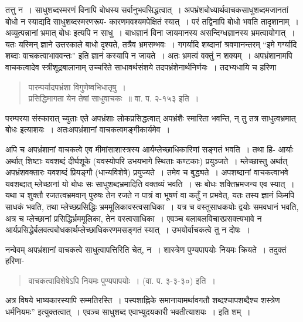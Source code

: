 {तत्तु न~। साधुशब्दस्मरणं विनापि बोधस्य सर्वानुभवसिद्धत्वात्~। अपभ्रंशबोध्यार्थवाचकसाधुशब्दमजानतां बोधो न स्याद्यदि साधुशब्दस्मरणरूप- कारणमवश्यमपेक्षितं स्यात्~। परं तद्विनापि बोधो भवति तादृशानाम्~। अव्युत्पन्नानां भ्रमात् बोधः इत्यपि न साधु~। बाधज्ञानं विना जायमानस्य असन्दिग्धज्ञानस्य भ्रमत्वायोगात्~। यतः यस्मिन् ज्ञाने उत्तरकाले बाधो दृश्यते, तत्रैव भ्रमसम्भवः~। गगर्यादि शब्दानां श्रवणानन्तरम् “इमे गर्ग्यादि शब्दाः वाचकत्वाभाववन्तः” इति ज्ञानं कस्यापि न जायते~। अतः भ्रमत्वं वक्तुं न शक्यम्~। अपभ्रंशानामपि वाचकत्वादेव स्त्रीशूद्रबालानाम् उच्चरिते साधावर्थसंशये तदपभ्रंशेनार्थनिर्णयः~। तदभ्यधायि च हरिणा 
\begin{verse}
पारम्पर्यादपभ्रंशा विगुणेष्वभिधातृषु~। \\
प्रसिद्धिमागता येन तेषां साधुवाचकः~॥ वा. प. २-१५३ इति~। 
\end{verse}
परम्परया संस्कारात् च्युताः एते अपभ्रंशाः लोकप्रसिद्धत्वात्  अपभ्रंशैः स्मारिता भवन्ति, न् तु तत्र साधुत्वभ्रमात् बोधः इत्याशयः~। अतःअपभ्रंशानां वाचकत्वमङ्गीकार्यमेव~। 

अपि च अपभ्रंशानां वाचकत्वे एव मीमांसाशास्त्रस्य आर्यम्लेच्छाधिकारिणां सङ्गतं भवति~। तथा हि- आर्याः अर्थात् शिष्टाः यवशब्दं दीर्घशूके (यवस्योपरि उभयभागे स्थिताः कण्टकाः) प्रयुञ्जते~। म्लेच्छास्तु अर्थात् अपभ्रंशवक्तारः यवशब्दं प्रियङ्गौ (धान्यविशेषे) प्रयुज्यते~। तमेव च बुद्ध्यते~। अपशब्दानां वाचकत्वाभवे यवशब्दात् म्लेच्छानां यो बोधः सः साधुशब्दभ्रमादिति वक्तव्यं भवति~। सः बोधः शक्तिभ्रमजन्य एव स्यात्~। यथा च शुक्तौ रजतत्वभ्रमवान् पुरुषः तेन रजते न पात्रं वा भूषणं वा कर्तुं न प्रभवेत्, यतः तस्य ज्ञानं किमपि साधकं भवति, तथा म्लेच्छप्रसिद्धिः भ्रममूलिकावस्त्वसाधिका~। यत्र च वस्तुसाधकयोः द्वयोः समवधानं भवति, अत्र च म्लेच्छानां प्रसिद्धिर्भ्रममूलिका, तेन वस्त्वसाधिका~। एवञ्च बलाबलविचारप्रसक्त्यभावे न आर्यप्रसिद्धेर्बलवत्वबोधकार्थम्लेच्छाधिकरणमसङ्गतं स्यात्~। उभयोर्वाचकत्वे तु न दोषः~। 

नन्वेवम् अपभ्रंशानां वाचकत्वे साधुत्वापत्तिरिति चेत्, न~। शास्त्रेण पुण्यपापयोः नियमः क्रियते~। तदुक्तं हरिणा-
\begin{verse}
वाचकत्वाविशेषेऽपि नियमः पुण्यपापयोः~। (वा. प. ३-३-३०) इति~। 
\end{verse}
अत्र विषये भाष्यकारस्यापि सम्मतिरस्ति~। पस्पशाह्निके समानायामर्थावगतौ शब्द\-श्चापशब्दैश्च शस्त्रेण धर्मनियमः” इत्युक्तत्वात्~। एवञ्च साधुशब्द एवाभ्युदयकारी भवतीत्याशयः~। इति शम्~। 

\articleend
}

